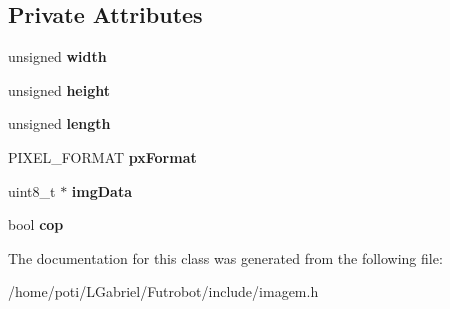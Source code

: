 \subsection*{Private Attributes}
\begin{DoxyCompactItemize}
\item 
unsigned {\bfseries width}\hypertarget{classImagemBruta_a65217e1f7e27e1345e1a5fe54f851f9e}{}\label{classImagemBruta_a65217e1f7e27e1345e1a5fe54f851f9e}

\item 
unsigned {\bfseries height}\hypertarget{classImagemBruta_a1584fed1d5c18d01e4b308ae7d8cbedc}{}\label{classImagemBruta_a1584fed1d5c18d01e4b308ae7d8cbedc}

\item 
unsigned {\bfseries length}\hypertarget{classImagemBruta_a1c837bfbb1aa7c8f35c0eed1f6dc9cd2}{}\label{classImagemBruta_a1c837bfbb1aa7c8f35c0eed1f6dc9cd2}

\item 
P\+I\+X\+E\+L\+\_\+\+F\+O\+R\+M\+AT {\bfseries px\+Format}\hypertarget{classImagemBruta_ac8c21e33e43b8ef8d138eafd62c3a523}{}\label{classImagemBruta_ac8c21e33e43b8ef8d138eafd62c3a523}

\item 
uint8\+\_\+t $\ast$ {\bfseries img\+Data}\hypertarget{classImagemBruta_ad3e7105f017414f30990e7e85195a0ed}{}\label{classImagemBruta_ad3e7105f017414f30990e7e85195a0ed}

\item 
bool {\bfseries cop}\hypertarget{classImagemBruta_a69628d301828a268764372b3e31d6140}{}\label{classImagemBruta_a69628d301828a268764372b3e31d6140}

\end{DoxyCompactItemize}


The documentation for this class was generated from the following file\+:\begin{DoxyCompactItemize}
\item 
/home/poti/\+L\+Gabriel/\+Futrobot/include/imagem.\+h\end{DoxyCompactItemize}
